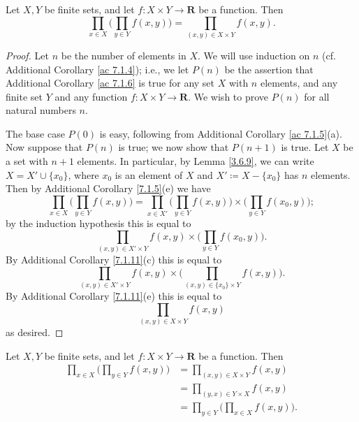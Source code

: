 \begin{additional corollary}\label{ac 7.1.6}
Let \(X, Y\) be finite sets, and let \(f : X \times Y \to \mathbf{R}\) be a function.
Then
\[
    \prod_{x \in X} \bigg(\prod_{y \in Y} f(x, y)\bigg) = \prod_{(x, y) \in X \times Y} f(x, y).
\]
\end{additional corollary}

\begin{proof}
    Let \(n\) be the number of elements in \(X\).
    We will use induction on \(n\) (cf. Additional Corollary \ref{ac 7.1.4});
    i.e., we let \(P(n)\) be the assertion that Additional Corollary \ref{ac 7.1.6} is true for any set \(X\) with \(n\) elements, and any finite set \(Y\) and any function \(f : X \times Y \to \mathbf{R}\).
    We wish to prove \(P(n)\) for all natural numbers \(n\).

    The base case \(P(0)\) is easy, following from Additional Corollary \ref{ac 7.1.5}(a).
    Now suppose that \(P(n)\) is true;
    we now show that \(P(n + 1)\) is true.
    Let \(X\) be a set with \(n + 1\) elements.
    In particular, by Lemma \ref{3.6.9}, we can write \(X = X' \cup \{x_0\}\), where \(x_0\) is an element of \(X\) and \(X' \coloneqq X - \{x_0\}\) has \(n\) elements.
    Then by Additional Corollary \ref{7.1.5}(e) we have
    \[
        \prod_{x \in X} \bigg(\prod_{y \in Y} f(x, y)\bigg) = \prod_{x \in X'} \bigg(\prod_{y \in Y} f(x, y)\bigg) \times \bigg(\prod_{y \in Y} f(x_0, y)\bigg);
    \]
    by the induction hypothesis this is equal to
    \[
        \prod_{(x, y) \in X' \times Y} f(x, y) \times \bigg(\prod_{y \in Y} f(x_0, y)\bigg).
    \]
    By Additional Corollary \ref{7.1.11}(c) this is equal to
    \[
        \prod_{(x, y) \in X' \times Y} f(x, y) \times \bigg(\prod_{(x, y) \in \{x_0\} \times Y} f(x, y)\bigg).
    \]
    By Additional Corollary \ref{7.1.11}(e) this is equal to
    \[
        \prod_{(x, y) \in X \times Y} f(x, y)
    \]
    as desired.
\end{proof}

\begin{additional corollary}\label{ac 7.1.7}
Let \(X, Y\) be finite sets, and let \(f : X \times Y \to \mathbf{R}\) be a function.
Then
\begin{align*}
    \prod_{x \in X} \bigg(\prod_{y \in Y} f(x, y)\bigg) & = \prod_{(x, y) \in X \times Y} f(x, y)                \\
                                                        & = \prod_{(y, x) \in Y \times X} f(x, y)                \\
                                                        & = \prod_{y \in Y} \bigg(\prod_{x \in X} f(x, y)\bigg).
\end{align*}
\end{additional corollary}


